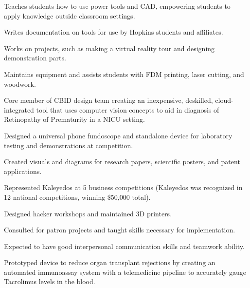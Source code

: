 \documentclass[]{deedy-resume}
\begin{document}
\begin{minipage}[t]{0.66\textwidth}
\begin{tightemize}
\item Teaches students how to use power tools and CAD, empowering students to apply knowledge outside classroom settings.
\item Writes documentation on tools for use by Hopkins students and affiliates.
\item Works on projects, such as making a virtual reality tour and designing demonstration parts.
\item Maintains equipment and assists students with FDM printing, laser cutting, and woodwork.
\end{tightemize}
\sectionsep

\begin{tightemize}
\item Core member of CBID design team creating an inexpensive, deskilled, cloud-integrated tool that uses computer vision concepts to aid in diagnosis of Retinopathy of Prematurity in a NICU setting.
\item Designed a universal phone fundoscope and standalone device for laboratory testing and demonstrations at competition.
\item Created visuals and diagrams for research papers, scientific posters, and patent applications.
\item Represented Kaleyedos at 5 business competitions (Kaleyedos was recognized in 12 national competitions, winning \$50,000 total).
\end{tightemize}
\sectionsep

\begin{tightemize}
\item Designed hacker workshops and maintained 3D printers.
\item Consulted for patron projects and taught skills necessary for implementation.
\item Expected to have good interpersonal communication skills and teamwork ability.
\end{tightemize}
\sectionsep

\begin{tightemize}
\item Prototyped device to reduce organ transplant rejections by creating an automated immunoassay system with a telemedicine pipeline to accurately gauge Tacrolimus levels in the blood.
\end{tightemize}
\sectionsep
\end{minipage} 
\end{document}
